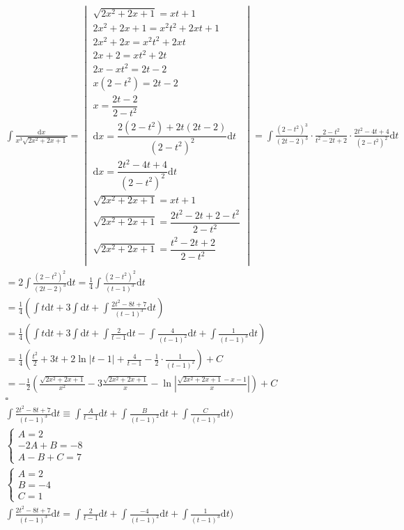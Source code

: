 \begin{gather*}
\int{\frac{\mbox{d}x}{x^3\sqrt{2x^2+2x+1}}} =
\begin{vmatrix}
  \sqrt{2x^2+2x+1}=xt+1\\
  2x^2+2x+1=x^2t^2+2xt+1\\
  2x^2+2x=x^2t^2+2xt\\
  2x+2=xt^2+2t\\
  2x-xt^2=2t-2\\
  x(2-t^2)=2t-2\\
  x=\dfrac{2t-2}{2-t^2}\\
  \mbox{d}x=\dfrac{2(2-t^2)+2t(2t-2)}{(2-t^2)^2}\mbox{d}t\\
  \mbox{d}x=\dfrac{2t^2-4t+4}{(2-t^2)^2}\mbox{d}t\\
  \sqrt{2x^2+2x+1}=xt+1 \\
  \sqrt{2x^2+2x+1}=\dfrac{2t^2-2t+2-t^2}{2-t^2}\\
  \sqrt{2x^2+2x+1}=\dfrac{t^2-2t+2}{2-t^2}\\
\end{vmatrix}
= \int{\frac{(2-t^2)^3}{(2t-2)^3}\cdot \frac{2-t^2}{t^2-2t+2}\cdot \frac{2t^2-4t+4}{(2-t^2)^2}\mbox{d}t}\\
= 2\int{\frac{(2-t^2)^2}{(2t-2)^3}\mbox{d}t}
= \frac{1}{4}\int{\frac{(2-t^2)^2}{(t-1)^3}\mbox{d}t}\\
= \frac{1}{4}\left(\int{t\mbox{d}t}+3\int{\mbox{d}t}+\int{\frac{2t^2-8t+7}{(t-1)^3}\mbox{d}t}\right)\\
= \frac{1}{4}\left(\int{t\mbox{d}t}+3\int{\mbox{d}t}+\int{\frac{2}{t-1}\mbox{d}t}-\int{\frac{4}{(t-1)^2}\mbox{d}t}+\int{\frac{1}{(t-1)^3}\mbox{d}t}\right)\\
= \frac{1}{4}\left(\frac{t^2}{2}+3t+2\ln{|t-1|}+\frac{4}{t-1}-\frac{1}{2}\cdot\frac{1}{(t-1)^2}\right)+C\\
= -\frac{1}{2}\left(\frac{\sqrt{2x^2+2x+1}}{x^2}-3\frac{\sqrt{2x^2+2x+1}}{x}-\ln{\left|\frac{\sqrt{2x^2+2x+1}-x-1}{x}\right|}\right)+C
\\ \square{} \\
\int{\frac{2t^2-8t+7}{(t-1)^3}\mbox{d}t} \equiv \int{\frac{A}{t-1}\mbox{d}t} + \int{\frac{B}{(t-1)^2}\mbox{d}t} + \int{\frac{C}{(t-1)^3}\mbox{d}t}) \\
\begin{cases}
  A=2\\
  -2A+B=-8\\
  A-B+C=7
\end{cases}\\
\begin{cases}
  A=2\\
  B=-4\\
  C=1
\end{cases}\\
\int{\frac{2t^2-8t+7}{(t-1)^3}\mbox{d}t} = \int{\frac{2}{t-1}\mbox{d}t} + \int{\frac{-4}{(t-1)^2}\mbox{d}t} + \int{\frac{1}{(t-1)^3}\mbox{d}t}) \\
\end{gather*}


